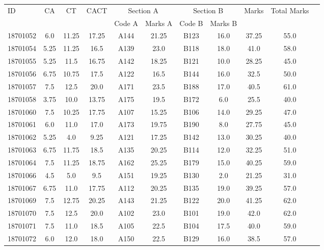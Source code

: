 \documentclass[12pt]{article}
\begin{document}
    \begin{center} 
	\renewcommand{\arraystretch}{1.08}
	\begin{small}
    \begin{tabular}{|l|c|c|c|c|c|c|c|c|c|c|} \hline
	\multirow{2}{*}{ID} & 	\multirow{2}{*}{CA}  & 	\multirow{2}{*}{CT}  & 	\multirow{2}{*}{CACT}  & \multicolumn{2 }{|c|}{Section A}& \multicolumn{2 }{c|}{Section B} & 	\multirow{2}{*}{Marks}  & 	\multirow{2}{*}{Total Marks}  \\ 
	&  &  &  & Code A & Marks A & Code B & Marks B&  &  \\ \hline
18701052 & 6.0 & 11.25 & 17.25 & A144 & 21.25 & B123 & 16.0 & 37.25 & 55.0\\ \hline 
18701054 & 5.25 & 11.25 & 16.5 & A139 & 23.0 & B118 & 18.0 & 41.0 & 58.0\\ \hline 
18701055 & 5.25 & 11.5 & 16.75 & A142 & 18.25 & B121 & 10.0 & 28.25 & 45.0\\ \hline 
18701056 & 6.75 & 10.75 & 17.5 & A122 & 16.5 & B144 & 16.0 & 32.5 & 50.0\\ \hline 
18701057 & 7.5 & 12.5 & 20.0 & A171 & 23.5 & B188 & 17.0 & 40.5 & 61.0\\ \hline 
18701058 & 3.75 & 10.0 & 13.75 & A175 & 19.5 & B172 & 6.0 & 25.5 & 40.0\\ \hline 
18701060 & 7.5 & 10.25 & 17.75 & A107 & 15.25 & B106 & 14.0 & 29.25 & 47.0\\ \hline 
18701061 & 6.0 & 11.0 & 17.0 & A173 & 19.75 & B190 & 8.0 & 27.75 & 45.0\\ \hline 
18701062 & 5.25 & 4.0 & 9.25 & A121 & 17.25 & B142 & 13.0 & 30.25 & 40.0\\ \hline 
18701063 & 6.75 & 11.75 & 18.5 & A135 & 20.25 & B114 & 12.0 & 32.25 & 51.0\\ \hline 
18701064 & 7.5 & 11.25 & 18.75 & A162 & 25.25 & B179 & 15.0 & 40.25 & 59.0\\ \hline 
18701066 & 4.5 & 5.0 & 9.5 & A151 & 19.25 & B130 & 2.0 & 21.25 & 31.0\\ \hline 
18701067 & 6.75 & 11.0 & 17.75 & A112 & 20.25 & B135 & 19.0 & 39.25 & 57.0\\ \hline 
18701069 & 7.5 & 12.75 & 20.25 & A143 & 21.25 & B122 & 20.0 & 41.25 & 62.0\\ \hline 
18701070 & 7.5 & 12.5 & 20.0 & A102 & 23.0 & B101 & 19.0 & 42.0 & 62.0\\ \hline 
18701071 & 7.5 & 11.0 & 18.5 & A105 & 22.5 & B104 & 17.5 & 40.0 & 59.0\\ \hline 
18701072 & 6.0 & 12.0 & 18.0 & A150 & 22.5 & B129 & 16.0 & 38.5 & 57.0\\ \hline 

\end{tabular}
\end{small}
\end{center}
\end{document}
